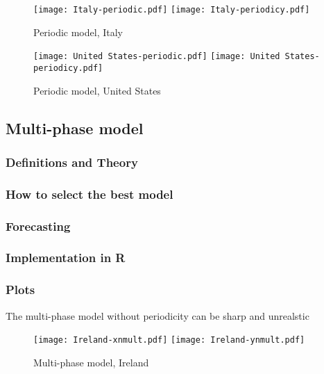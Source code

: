 \begin{figure}[H]
  \texttt{[image: Italy-periodic.pdf]} \label{fig:italy-periodic}
\endminipage\hfill
{}
  \texttt{[image: Italy-periodicy.pdf]} \label{fig:italy-periodicy}
\endminipage
\caption{Periodic model, Italy}
\end{figure}

\begin{figure}[H]
  \texttt{[image: United States-periodic.pdf]} \label{fig:usa-periodic}
\endminipage\hfill
{}
  \texttt{[image: United States-periodicy.pdf]} \label{fig:usa-periodicy}
\endminipage
\caption{Periodic model, United States}
\end{figure}

\subsection{Multi-phase model}

\subsubsection{Definitions and Theory}

\subsubsection{How to select the best model}

\subsubsection{Forecasting}

\subsubsection{Implementation in R}

\subsubsection{Plots}

The multi-phase model without periodicity can be sharp and unrealstic

\begin{figure}[H]
  \texttt{[image: Ireland-xnmult.pdf]} \label{fig:ireland-xnmult}
\endminipage\hfill
{}
  \texttt{[image: Ireland-ynmult.pdf]} \label{fig:ireland-ynmult}
\endminipage
\caption{Multi-phase model, Ireland}
\end{figure}

